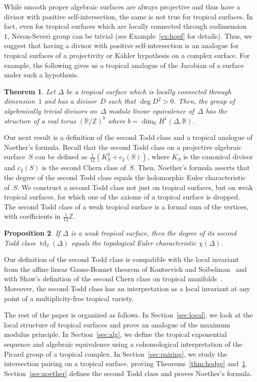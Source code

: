 \documentclass[11pt]{amsart}
\newtheorem{thm}{Theorem}[section]
\newtheorem{prop}[thm]{Proposition}
\theoremstyle{definition}
\newcommand{\RR}{\mathbb R}
\newcommand{\td}{\operatorname{td}}
\newcommand{\ZZ}{\mathbb Z}
\begin{document}
While smooth proper algebraic surfaces are always projective and thus have a
divisor with positive self-intersection, the same is not true for tropical
surfaces. In fact, even for tropical surfaces which are locally
connected through codimension~$1$, N\'eron-Severi group can be trivial (see
Example~\ref{ex:hopf} for details). Thus, we suggest that having a divisor with positive
self-intersection is an analogue for tropical surfaces of a projectivity or
K\"ahler hypothesis on a complex surface. For example, the following gives us a
tropical analogue of the Jacobian of a surface under such a hypothesis.
\begin{thm}\label{thm:jacobian}
Let $\Delta$ be a tropical surface which is locally connected through
dimension~$1$ and has a divisor~$D$ such that $\deg D^2 > 0$. Then, the group of
algebraically trivial divisors on~$\Delta$ modulo linear equivalence
of~$\Delta$ has the structure of a real torus $(\RR/\ZZ)^b$ where $b =
\dim_{\RR} H^1(\Delta, \RR)$.
\end{thm}

Our next result is a definition of the second Todd class and a tropical analogue
of Noether's formula. Recall that the second Todd class on a projective
algebraic surface~$S$
can be defined as $\frac{1}{12}(K_S^2 + c_2(S))$, where $K_S$ is the canonical
divisor and $c_2(S)$ is the second Chern class of~$S$. Then, Noether's formula
asserts that the degree of the second Todd class equals the holomorphic Euler
characteristic of~$S$. We construct a second Todd class not just on tropical
surfaces, but on weak tropical surfaces, for which one of the axioms of a
tropical surface is dropped. The second Todd class of a weak tropical surface is
a formal sum of the vertices, with coefficients in $\frac{1}{12}\ZZ$.
\begin{prop}\label{prop:noether}
If $\Delta$ is a weak tropical surface, then the degree of its second
Todd class $\td_2(\Delta)$ equals the topological Euler characteristic
$\chi(\Delta)$.
\end{prop}

Our definition of the second Todd class is compatible with the local invariant
from the affine linear Gauss-Bonnet theorem of Kontsevich and
Soibelman~\cite[Sec.~6.5]{kontsevich-soibelman} and with
Shaw's definition of the second Chern class on tropical
manifolds~\cite[Sec.~3.2]{shaw}. Moreover, the second Todd class has an
interpretation as a local invariant at any point of a multiplicity-free tropical
variety.

The rest of the paper is organized as follows. In Section~\ref{sec:local}, we
look at the local structure of tropical surfaces and prove an analogue of the
maximum modulus principle. In Section~\ref{sec:alg}, we define the tropical
exponential sequence and algebraic equivalence using a cohomological
interpretation of the Picard group of a tropical complex.
In Section~\ref{sec:pairing}, we study the intersection
pairing on a tropical surface, proving Theorems~\ref{thm:hodge}
and~\ref{thm:jacobian}. Section~\ref{sec:noether} defines the second
Todd class and proves Noether's formula.
\end{document}
